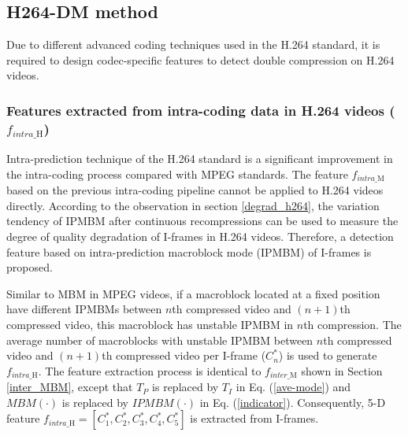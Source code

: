 \documentclass[journal,sort]{IEEEtran}
\begin{document}
\subsection{H264-DM method}
Due to different advanced coding techniques used in the H.264 standard, it is required to design codec-specific features to detect double compression on H.264 videos. 


\subsubsection{Features extracted from intra-coding data in H.264 videos ($f_{intra\_\text{H}}$) \label{h264-ipmbm}}
Intra-prediction technique of the H.264 standard is a significant improvement in the intra-coding process compared with MPEG standards. The feature $f_{intra\_\text{M}}$ based on the previous intra-coding pipeline cannot be applied to H.264 videos directly. According to the observation in section \ref{degrad_h264}, the variation tendency of IPMBM after continuous recompressions can be used to measure the degree of quality degradation of I-frames in H.264 videos. Therefore, a detection feature based on intra-prediction macroblock mode (IPMBM) of I-frames is proposed. 

Similar to MBM in MPEG videos, if a macroblock located at a fixed position have different IPMBMs between $n$th compressed video and $(n+1)$th compressed video, this macroblock has unstable IPMBM in $n$th compression. The average number of macroblocks with unstable IPMBM between
$n$th compressed video and $(n+1)$th compressed video per I-frame ($C^*_n$) is used to generate $f_{intra\_\text{H}}$. The feature extraction process is identical to $f_{inter\_\text{M}}$ shown in Section \ref{inter_MBM}, except that $T_P$ is replaced by $T_I$ in Eq. (\ref{ave-mode}) and $MBM(\cdot)$ is replaced by $IPMBM(\cdot)$ in Eq. (\ref{indicator}). Consequently, 5-D feature $f_{intra\_\text{H}}=\left[C^*_1,C^*_2,C^*_3,C^*_4,C^*_5 \right]$ is extracted from I-frames.
\end{document}
